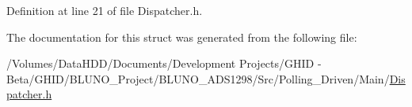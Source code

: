 \-Definition at line 21 of file \-Dispatcher.\-h.



\-The documentation for this struct was generated from the following file\-:\begin{DoxyCompactItemize}
\item 
/\-Volumes/\-Data\-H\-D\-D/\-Documents/\-Development Projects/\-G\-H\-I\-D -\/ Beta/\-G\-H\-I\-D/\-B\-L\-U\-N\-O\-\_\-\-Project/\-B\-L\-U\-N\-O\-\_\-\-A\-D\-S1298/\-Src/\-Polling\-\_\-\-Driven/\-Main/\hyperlink{_dispatcher_8h}{\-Dispatcher.\-h}\end{DoxyCompactItemize}
